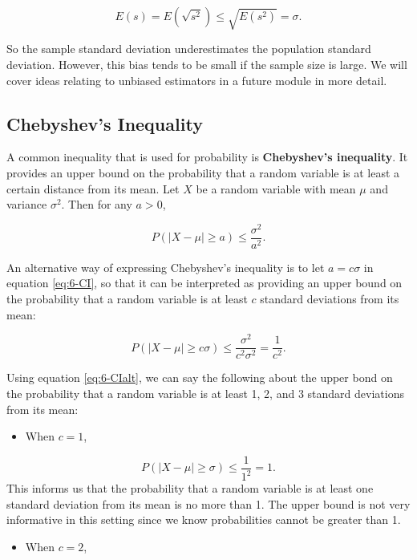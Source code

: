 \documentclass[
]{book}
\providecommand{\tightlist}{%
  \setlength{\itemsep}{0pt}\setlength{\parskip}{0pt}}
\begin{document}
\[
E(s) = E(\sqrt{s^2}) \leq \sqrt{E(s^2)} = \sigma.
\]

So the sample standard deviation underestimates the population standard deviation. However, this bias tends to be small if the sample size is large. We will cover ideas relating to unbiased estimators in a future module in more detail.

\hypertarget{chebyshevs-inequality}{%
\subsection{Chebyshev's Inequality}\label{chebyshevs-inequality}}

A common inequality that is used for probability is \textbf{Chebyshev's inequality}. It provides an upper bound on the probability that a random variable is at least a certain distance from its mean. Let \(X\) be a random variable with mean \(\mu\) and variance \(\sigma^2\). Then for any \(a>0\),

\begin{equation} 
P(|X-\mu| \geq a) \leq \frac{\sigma^2}{a^2}.
\label{eq:6-CI}
\end{equation}

An alternative way of expressing Chebyshev's inequality is to let \(a = c \sigma\) in equation \eqref{eq:6-CI}, so that it can be interpreted as providing an upper bound on the probability that a random variable is at least \(c\) standard deviations from its mean:

\begin{equation} 
P(|X-\mu| \geq c \sigma) \leq \frac{\sigma^2}{c^2 \sigma^2} = \frac{1}{c^2}.
\label{eq:6-CIalt}
\end{equation}

Using equation \eqref{eq:6-CIalt}, we can say the following about the upper bond on the probability that a random variable is at least 1, 2, and 3 standard deviations from its mean:

\begin{itemize}
\tightlist
\item
  When \(c=1\),
\end{itemize}

\[
P(|X-\mu| \geq \sigma) \leq \frac{1}{1^2} = 1.
\]
This informs us that the probability that a random variable is at least one standard deviation from its mean is no more than 1. The upper bound is not very informative in this setting since we know probabilities cannot be greater than 1.

\begin{itemize}
\tightlist
\item
  When \(c=2\),
\end{itemize}
\end{document}
